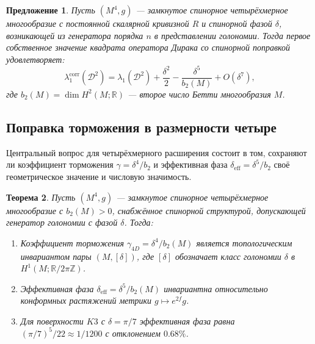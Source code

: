 \documentclass[12pt,a4paper]{article}
\newtheorem{theorem}{Теорема}[section]
\newtheorem{proposition}[theorem]{Предложение}
\theoremstyle{definition}
\theoremstyle{remark}
\newcommand{\RR}{\mathbb{R}}
\newcommand{\ZZ}{\mathbb{Z}}
\newcommand{\cD}{\mathcal{D}}
\begin{document}
\begin{proposition}
\label{prop:4d-spectrum-ru}
Пусть $(M^4, g)$ --- замкнутое спинорное четырёхмерное многообразие с постоянной скалярной кривизной $R$ и спинорной фазой $\delta$, возникающей из генератора порядка $n$ в представлении голономии. Тогда первое собственное значение квадрата оператора Дирака со спинорной поправкой удовлетворяет:
\begin{equation}
\lambda_1^{\mathrm{corr}}(\cD^2) = \lambda_1(\cD^2) + \frac{\delta^2}{2} - \frac{\delta^5}{b_2(M)} + O(\delta^7),
\end{equation}
где $b_2(M) = \dim H^2(M; \RR)$ --- второе число Бетти многообразия $M$.
\end{proposition}

\subsection{Поправка торможения в размерности четыре}

Центральный вопрос для четырёхмерного расширения состоит в том, сохраняют ли коэффициент торможения $\gamma = \delta^4/b_2$ и эффективная фаза $\delta_{\mathrm{eff}} = \delta^5/b_2$ своё геометрическое значение и числовую значимость.

\begin{theorem}
\label{thm:4d-braking-ru}
Пусть $(M^4, g)$ --- замкнутое спинорное четырёхмерное многообразие с $b_2(M) > 0$, снабжённое спинорной структурой, допускающей генератор голономии с фазой $\delta$. Тогда:
\begin{enumerate}[label=(\roman*)]
\item Коэффициент торможения $\gamma_{4D} = \delta^4/b_2(M)$ является топологическим инвариантом пары $(M, [\delta])$, где $[\delta]$ обозначает класс голономии $\delta$ в $H^1(M; \RR/2\pi\ZZ)$.
\item Эффективная фаза $\delta_{\mathrm{eff}} = \delta^5/b_2(M)$ инвариантна относительно конформных растяжений метрики $g \mapsto e^{2f} g$.
\item Для поверхности $K3$ с $\delta = \pi/7$ эффективная фаза равна $(\pi/7)^5/22 \approx 1/1200$ с отклонением $0.68\%$.
\end{enumerate}
\end{theorem}
\end{document}
